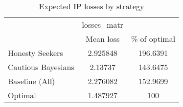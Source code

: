 \begin{table}[htbp]\centering
\caption{Expected IP losses by strategy}
\begin{tabular}{l*{2}{c}}
\hline\hline
            & losses\_matr&            \\
            &   Mean loss&\% of optimal\\
\hline
Honesty Seekers&    2.925848&    196.6391\\
Cautious Bayesians&     2.13737&    143.6475\\
Baseline (All)&    2.276082&    152.9699\\
Optimal     &    1.487927&         100\\
\hline\hline
\end{tabular}
\end{table}
